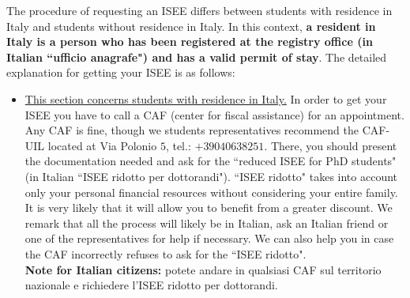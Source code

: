 \documentclass{sissavademecum}
\begin{document}
The procedure of requesting an ISEE differs between students with residence in Italy and students without residence in Italy. In this context, \textbf{a resident in Italy is a person who has been registered at the registry office (in Italian ``ufficio anagrafe") and has a valid permit of stay}. The detailed explanation for getting your ISEE is as follows:
\begin{itemize}
    \item \underline{This section concerns students with residence in Italy.}
    In order to get your ISEE you have to call a CAF (center for fiscal assistance) for an appointment. Any CAF is fine, though we students representatives recommend the CAF-UIL located at Via Polonio $5$, tel.: $+39040638251$. There, you should present the documentation needed and ask for the ``reduced ISEE for PhD students" (in Italian ``ISEE ridotto per dottorandi"). ``ISEE ridotto" takes into account only your personal financial resources without considering your entire family. It is very likely that it will allow you to benefit from a greater discount. We remark that all the process will likely be in Italian, ask an Italian friend or one of the representatives for help if necessary. We can also help you in case the CAF incorrectly refuses to ask for the ``ISEE ridotto". \\
    \textbf{Note for Italian citizens:} potete andare in qualsiasi CAF sul territorio nazionale e richiedere l'ISEE ridotto per dottorandi.
    

\end{itemize}
\end{document}
